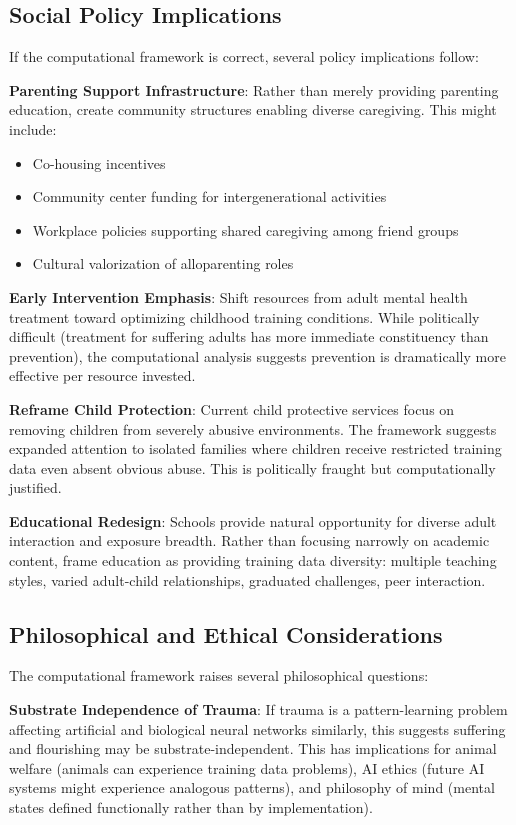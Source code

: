 \documentclass{article}
\begin{document}
\subsection{Social Policy Implications}

If the computational framework is correct, several policy implications follow:

\textbf{Parenting Support Infrastructure}: Rather than merely providing parenting education, create community structures enabling diverse caregiving. This might include:
\begin{itemize}
\item Co-housing incentives
\item Community center funding for intergenerational activities
\item Workplace policies supporting shared caregiving among friend groups
\item Cultural valorization of alloparenting roles
\end{itemize}

\textbf{Early Intervention Emphasis}: Shift resources from adult mental health treatment toward optimizing childhood training conditions. While politically difficult (treatment for suffering adults has more immediate constituency than prevention), the computational analysis suggests prevention is dramatically more effective per resource invested.

\textbf{Reframe Child Protection}: Current child protective services focus on removing children from severely abusive environments. The framework suggests expanded attention to isolated families where children receive restricted training data even absent obvious abuse. This is politically fraught but computationally justified.

\textbf{Educational Redesign}: Schools provide natural opportunity for diverse adult interaction and exposure breadth. Rather than focusing narrowly on academic content, frame education as providing training data diversity: multiple teaching styles, varied adult-child relationships, graduated challenges, peer interaction.

\subsection{Philosophical and Ethical Considerations}

The computational framework raises several philosophical questions:

\textbf{Substrate Independence of Trauma}: If trauma is a pattern-learning problem affecting artificial and biological neural networks similarly, this suggests suffering and flourishing may be substrate-independent. This has implications for animal welfare (animals can experience training data problems), AI ethics (future AI systems might experience analogous patterns), and philosophy of mind (mental states defined functionally rather than by implementation).
\end{document}
